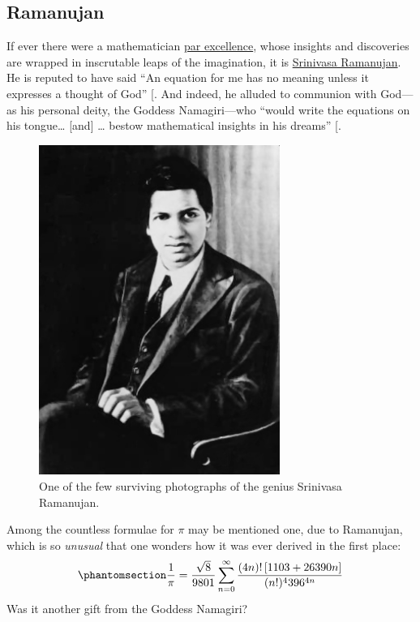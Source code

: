 \documentclass[
  a4paper,
]{article}
\begin{document}
\subsection{Ramanujan}\label{ramanujan}

If ever there were a mathematician
\href{https://www.thefreedictionary.com/par+excellence}{par excellence},
whose insights and discoveries are wrapped in inscrutable leaps of the
imagination, it is
\href{https://en.wikipedia.org/wiki/Srinivasa_Ramanujan}{Srinivasa
Ramanujan}. He is reputed to have said ``An equation for me has no
meaning unless it expresses a thought of God''
{[}\citeproc{ref-kanigel-1992}{41}{]}. And indeed, he alluded to
communion with God---as his personal deity, the Goddess Namagiri---who
``would write the equations on his tongue\ldots{} {[}and{]} \ldots{}
bestow mathematical insights in his dreams''
{[}\citeproc{ref-kanigel-1992}{41}{]}.

\begin{figure}
\centering
\includegraphics[width=0.7\textwidth,height=\textheight]{images/Srinivasa_Ramanujan_Cleanup.jpg}
\caption{One of the few surviving photographs of the genius Srinivasa
Ramanujan.}\label{fig:ramanujan}
\end{figure}

Among the countless formulae for \(\pi\) may be mentioned one, due to
Ramanujan, which is so \emph{unusual} that one wonders how it was ever
derived in the first place:
\begin{equation}\phantomsection\label{eq:ramanujan-pi}{
\frac{1}{\pi} = \frac{\sqrt 8}{9801}\sum_{n = 0}^{\infty}%
\frac{(4n)!\left[ 1103 + 26390n \right]}{(n!)^4 396^{4n}}
}\end{equation} Was it another gift from the Goddess Namagiri?
\end{document}
